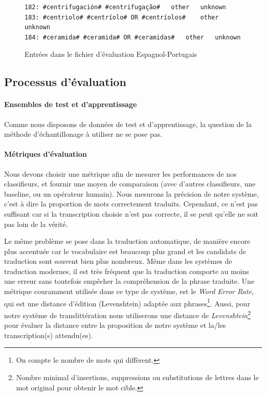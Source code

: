 \documentclass{article}
\begin{document}
\begin{figure}[H]
\caption{Entrées dans le fichier d'évaluation Espagnol-Portugais}
\begin{verbatim}
182: #centrifugación# #centrifugação#	other	unknown
183: #centriolo# #centríolo# OR #centríolos#	other	unknown
184: #ceramida# #ceramida# OR #ceramidas#	other	unknown
\end{verbatim}
\end{figure}

\subsection{Processus d'évaluation}
\label{eval}
\paragraph{Ensembles de test et d'apprentissage}
Comme nous disposons de données de test et d'apprentissage, la question de la méthode d'échantillonage à utiliser ne se pose pas.

\paragraph{Métriques d'évaluation}
Nous devons choisir une métrique afin de mesurer les performances de nos classifieurs, et fournir une moyen de comparaison (avec d'autres classifieurs, une baseline, ou un opérateur humain).
Nous mesurons la précision de notre système, c'est à dire la proportion de mots correctement traduits. Cependant, ce n'est pas suffisant car si la transcription choisie n'est pas correcte, il se peut qu'elle ne soit pas loin de la vérité.

Le même problème se pose dans la traduction automatique, de manière encore plus accentuée car le vocabulaire est beaucoup plus grand et les candidats de traduction sont souvent bien plus nombreux. Même dans les systèmes de traduction modernes, il est très fréquent que la traduction comporte au moins une erreur sans toutefois empêcher la compréhension de la phrase traduite. Une métrique couramment utilisée dans ce type de système, est le \emph{Word Error Rate}, qui est une distance d'édition (Levenshtein) adaptée aux phrases\footnote{On compte le nombre de mots qui diffèrent.}.
Aussi, pour notre système de translittération nous utiliserons une distance de \emph{Levenshtein}\footnote{Nombre minimal d'insertions, suppressions ou substitutions de lettres dans le mot original pour obtenir le mot cible.} pour évaluer la distance entre la proposition de notre système et la/les transcription(s) attendu(es).
\end{document}
